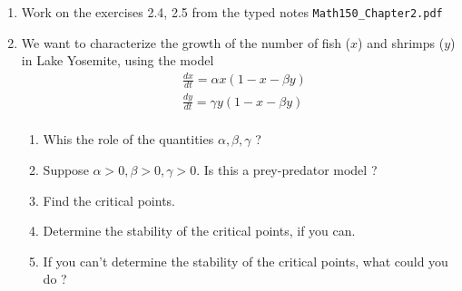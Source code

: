 \documentclass[11pt]{article}
\begin{document}
\begin{enumerate}
\item Work on the exercises 2.4, 2.5 from the typed notes \texttt{Math150\_Chapter2.pdf}

\item  We want to characterize the growth of the number of fish ($x$) and shrimps ($y$) in Lake Yosemite, using the model
\[ \begin{aligned}
& \frac{d x}{d t} = \alpha x (1 - x -\beta y) \\
& \frac{d y}{d t} = \gamma y (1 - x - \beta y) \\
\end{aligned} 
\]
\begin{enumerate}
\item Whis the role of the quantities $\alpha, \beta, \gamma$ ? 
\item Suppose $\alpha >0, \beta>0, \gamma>0$. Is this a prey-predator model ? 
\item Find the critical points.
\item Determine the stability of the critical points, if you can.
\item If you can't determine the stability of the critical points, what could you do ?
\end{enumerate}

% 




\end{enumerate}
\end{document}
